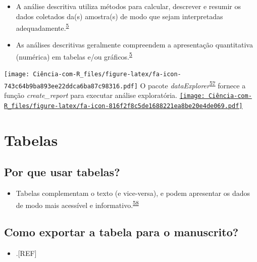 \documentclass[
]{book}
\providecommand{\tightlist}{%
  \setlength{\itemsep}{0pt}\setlength{\parskip}{0pt}}
\begin{document}
\begin{itemize}
\item
  A análise descritiva utiliza métodos para calcular, descrever e resumir os dados coletados da(s) amostra(s) de modo que sejam interpretadas adequadamente.\textsuperscript{\protect\hyperlink{ref-vetter2017}{5}}
\item
  As análises descritivas geralmente compreendem a apresentação quantitativa (numérica) em tabelas e/ou gráficos.\textsuperscript{\protect\hyperlink{ref-vetter2017}{5}}
\end{itemize}

\texttt{[image: Ciência-com-R\_files/figure-latex/fa-icon-743c64b9ba893ee22ddca6ba87c98316.pdf]} O pacote \emph{dataExplorer}\textsuperscript{\protect\hyperlink{ref-DataExplorer}{57}} fornece a função \emph{create\_report} para executar análise exploratória. \href{https://cran.r-project.org/web/packages/DataExplorer/index.html}{\texttt{[image: Ciência-com-R\_files/figure-latex/fa-icon-816f2f8c5de1688221ea8be20e4de069.pdf]}}

\hypertarget{tabelas}{%
\section{Tabelas}\label{tabelas}}

\hypertarget{por-que-usar-tabelas}{%
\subsection{Por que usar tabelas?}\label{por-que-usar-tabelas}}

\begin{itemize}
\tightlist
\item
  Tabelas complementam o texto (e vice-versa), e podem apresentar os dados de modo mais acessível e informativo.\textsuperscript{\protect\hyperlink{ref-Inskip2017}{58}}
\end{itemize}

\hypertarget{como-exportar-a-tabela-para-o-manuscrito}{%
\subsection{Como exportar a tabela para o manuscrito?}\label{como-exportar-a-tabela-para-o-manuscrito}}

\begin{itemize}
\tightlist
\item
  .{[}REF{]}
\end{itemize}
\end{document}
